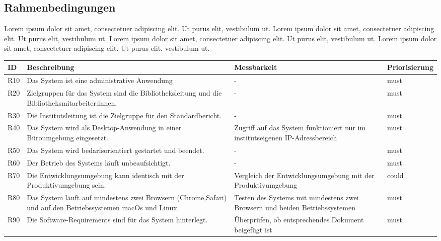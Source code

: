 \subsection{Rahmenbedingungen}
Lorem ipsum dolor sit amet, consectetuer adipiscing elit. Ut purus elit, vestibulum ut. Lorem ipsum dolor sit amet, consectetuer adipiscing elit. Ut purus elit, vestibulum ut.
Lorem ipsum dolor sit amet, consectetuer adipiscing elit. Ut purus elit, vestibulum ut.
Lorem ipsum dolor sit amet, consectetuer adipiscing elit. Ut purus elit, vestibulum ut.
\begingroup
\setlength{\tabcolsep}{10pt} %
\renewcommand{\arraystretch}{1.25} 
\begin{table}[h]
    \centering
    \begin{adjustbox}{max width=\textwidth}
    \begin{tabular}{lp{6.5cm}p{6.5cm}l}
       \toprule
       \textbf{ID}          & \textbf{Beschreibung} & \textbf{Messbarkeit} & \textbf{Priorisierung}\\
       \midrule
        R10                               &Das System ist eine administrative Anwendung & -  & must\\
        R20                               &Zielgruppen für das System sind die Bibliotheksleitung und die Bibliotheksmitarbeiter:innen. & -  & must\\
        R30                               &Die Institutsleitung ist die Zielgruppe für den Standardbericht. & -  & must\\
        R40                               &Das System wird als Desktop-Anwendung in einer Büroumgebung eingesetzt. & Zugriff auf das System funktioniert nur im institutseigenen IP-Adressbereich & must\\
        R50                               &Das System wird bedarfsorientiert gestartet und beendet. & -  & must\\
        R60                               &Der Betrieb des Systems läuft unbeaufsichtigt. & -  & must\\
        R70                               &Die Entwicklungsumgebung kann identisch mit der Produktivumgebung sein. & Vergleich der Entwicklungsumgebung mit der Produktivumgebung  & could\\
        R80                               &Das System läuft auf mindestens zwei Browsern (Chrome,Safari) und auf den Betriebssystemen macOs und Linux. & Testen des Systems mit mindestens zwei Browsern und beiden Betriebssystemen  & must\\
        R90                               &Die Software-Requirements sind für das System hinterlegt. & Überprüfen, ob entsprechendes Dokument beigefügt ist  & must\\

\end{tabular}
\end{adjustbox}
\end{table}
